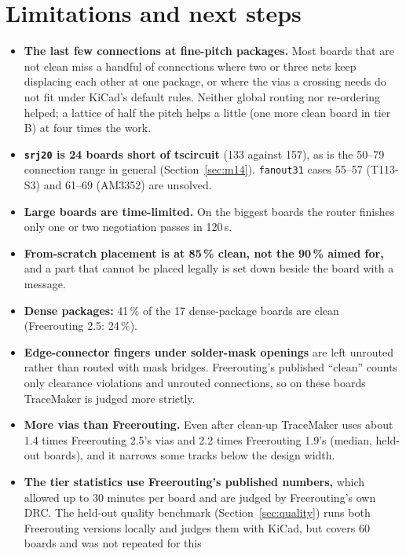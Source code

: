 \documentclass[10pt,a4paper]{article}
\begin{document}
\section{Limitations and next steps}
\label{sec:limits}

\begin{itemize}[leftmargin=*]
  \item \textbf{The last few connections at fine-pitch packages.} Most boards that are not clean miss a handful of
  connections where two or three nets keep displacing each other at one package, or where the vias a crossing needs
  do not fit under KiCad's default rules. Neither global routing nor re-ordering helped; a lattice of half the
  pitch helps a little (one more clean board in tier B) at four times the work.
  \item \textbf{\texttt{srj20} is 24 boards short of tscircuit} (133 against 157), as is the 50--79 connection range in
  general (Section~\ref{sec:m14}). \texttt{fanout31} cases 55--57 (T113-S3) and 61--69 (AM3352) are unsolved.
  \item \textbf{Large boards are time-limited.} On the biggest boards the router finishes only one or two negotiation
  passes in 120\,s.
  \item \textbf{From-scratch placement is at 85\,\% clean, not the 90\,\% aimed for,} and a part that cannot be placed
  legally is set down beside the board with a message.
  \item \textbf{Dense packages:} 41\,\% of the 17 dense-package boards are clean (Freerouting 2.5: 24\,\%).
  \item \textbf{Edge-connector fingers under solder-mask openings} are left unrouted rather than routed with
  mask bridges. Freerouting's published ``clean'' counts only clearance violations and unrouted connections, so on
  these boards TraceMaker is judged more strictly.
  \item \textbf{More vias than Freerouting.} Even after clean-up TraceMaker uses about 1.4 times Freerouting 2.5's vias
  and 2.2 times Freerouting 1.9's (median, held-out boards), and it narrows some tracks below the design width.
  \item \textbf{The tier statistics use Freerouting's published numbers,} which allowed up to 30 minutes per board and
  are judged by Freerouting's own DRC. The held-out quality benchmark (Section~\ref{sec:quality}) runs both
  Freerouting versions locally and judges them with KiCad, but covers 60 boards and was not repeated for this

\end{itemize}
\end{document}
